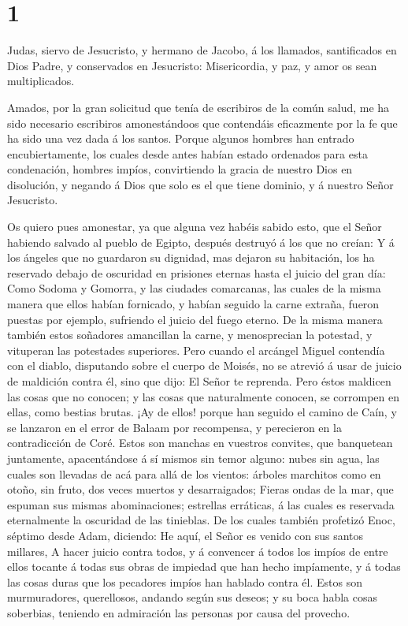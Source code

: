 \hypertarget{section}{%
\section{1}\label{section}}

 Judas, siervo de Jesucristo, y hermano de Jacobo, á los
llamados, santificados en Dios Padre, y conservados en Jesucristo:
 Misericordia, y paz, y amor os sean multiplicados.

 Amados, por la gran solicitud que tenía de escribiros de la
común salud, me ha sido necesario escribiros amonestándoos que
contendáis eficazmente por la fe que ha sido una vez dada á los santos.
 Porque algunos hombres han entrado encubiertamente, los
cuales desde antes habían estado ordenados para esta condenación,
hombres impíos, convirtiendo la gracia de nuestro Dios en disolución, y
negando á Dios que solo es el que tiene dominio, y á nuestro Señor
Jesucristo.

 Os quiero pues amonestar, ya que alguna vez habéis sabido
esto, que el Señor habiendo salvado al pueblo de Egipto, después
destruyó á los que no creían:  Y á los ángeles que no
guardaron su dignidad, mas dejaron su habitación, los ha reservado
debajo de oscuridad en prisiones eternas hasta el juicio del gran día:
 Como Sodoma y Gomorra, y las ciudades comarcanas, las
cuales de la misma manera que ellos habían fornicado, y habían seguido
la carne extraña, fueron puestas por ejemplo, sufriendo el juicio del
fuego eterno.  De la misma manera también estos soñadores
amancillan la carne, y menosprecian la potestad, y vituperan las
potestades superiores.  Pero cuando el arcángel Miguel
contendía con el diablo, disputando sobre el cuerpo de Moisés, no se
atrevió á usar de juicio de maldición contra él, sino que dijo: El Señor
te reprenda.  Pero éstos maldicen las cosas que no conocen;
y las cosas que naturalmente conocen, se corrompen en ellas, como
bestias brutas.  ¡Ay de ellos! porque han seguido el camino
de Caín, y se lanzaron en el error de Balaam por recompensa, y
perecieron en la contradicción de Coré.  Estos son manchas
en vuestros convites, que banquetean juntamente, apacentándose á sí
mismos sin temor alguno: nubes sin agua, las cuales son llevadas de acá
para allá de los vientos: árboles marchitos como en otoño, sin fruto,
dos veces muertos y desarraigados;  Fieras ondas de la mar,
que espuman sus mismas abominaciones; estrellas erráticas, á las cuales
es reservada eternalmente la oscuridad de las tinieblas. 
De los cuales también profetizó Enoc, séptimo desde Adam, diciendo: He
aquí, el Señor es venido con sus santos millares,  A hacer
juicio contra todos, y á convencer á todos los impíos de entre ellos
tocante á todas sus obras de impiedad que han hecho impíamente, y á
todas las cosas duras que los pecadores impíos han hablado contra él.
 Estos son murmuradores, querellosos, andando según sus
deseos; y su boca habla cosas soberbias, teniendo en admiración las
personas por causa del provecho.

